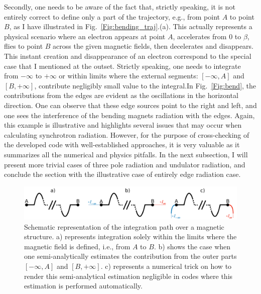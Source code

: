     Secondly, one needs to be aware of the fact that, strictly speaking, it is not entirely correct to define only a part of the trajectory, e.g., from point $A$ to point $B$, as I have illustrated in Fig.~\ref{Fig:bending_traj}.(a). This actually represents a physical scenario where an electron appears at point $A$, accelerates from $0$ to $\beta$, flies to point $B$ across the given magnetic fields, then decelerates and disappears. This instant creation and disappearance of an electron correspond to the special case that I mentioned at the outset. Strictly speaking, one needs to integrate from $-\infty$ to $+\infty$ or within limits where the external segments: $[-\infty, A]$ and $[B, +\infty]$, contribute negligibly small value to the integral.In Fig.~\ref{Fig:bend}, the contributions from the edges are evident as the oscillations in the horizontal direction. One can observe that these edge sources point to the right and left, and one sees the interference of the bending magnets radiation with the edges. Again, this example is illustrative and highlights several issues that may occur when calculating synchrotron radiation. However, for the purpose of cross-checking of the developed code with well-established approaches, it is very valuable as it summarizes all the numerical and physics pitfalls. In the next subsection, I will present more trivial cases of three pole radiation and undulator radiation, and conclude the section with the illustrative case of entirely edge radiation case.
    
    \begin{figure}[h!]
    	\centering
        \includegraphics[width=0.95\linewidth]{content/images/5_THz_Source/integration_lim.pdf}
        \captionsetup{justification=centering}
        \caption{Schematic representation of the integration path over a magnetic structure. a) represents integration solely within the limits where the magnetic field is defined, i.e., from $A$ to $B$. b) shows the case when one semi-analytically estimates the contribution from the outer parts $[-\infty, A]$ and $[B, +\infty]$. c) represents a numerical trick on how to render this semi-analytical estimation negligible in codes where this estimation is performed automatically.}
        \label{Fig:integration_lim}
    \end{figure}
    
